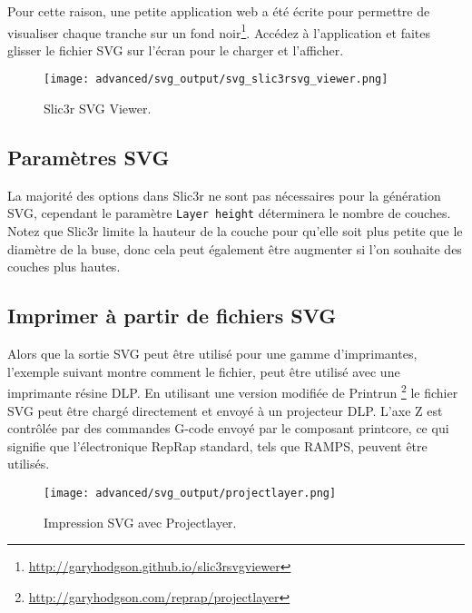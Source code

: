 Pour cette raison, une petite application web a \'et\'e \'ecrite pour permettre de visualiser chaque tranche sur un fond noir\footnote{\url{http://garyhodgson.github.io/slic3rsvgviewer}}.  Acc\'edez \`a l'application et faites glisser le fichier SVG sur l'\'ecran pour le charger et l'afficher.

\begin{figure}[H]
\centering
\texttt{[image: advanced/svg\_output/svg\_slic3rsvg\_viewer.png]}
\caption{Slic3r SVG Viewer.}
\label{fig:svg_slic3rsvg_viewer}
\end{figure}

\subsection{Param\`etres SVG} %
\label{sub:svg_settings}

La majorit\'e des options dans Slic3r ne sont pas n\'ecessaires pour la g\'en\'eration SVG, cependant le param\`etre \texttt{Layer height} d\'eterminera le nombre de couches. Notez que Slic3r limite la hauteur de la couche pour qu'elle soit plus petite que le diam\`etre de la buse, donc cela peut \'egalement \^etre augmenter si l'on souhaite des couches plus hautes.


\subsection{Imprimer \`a partir de fichiers SVG} %
\label{sub:printing_with_svg}

Alors que la sortie SVG peut \^etre utilis\'e pour une gamme d'imprimantes, l'exemple suivant montre comment le fichier, peut \^etre utilis\'e avec une imprimante r\'esine DLP. En utilisant une version modifi\'ee de Printrun \footnote{\url{http://garyhodgson.com/reprap/projectlayer}} le fichier SVG peut \^etre charg\'e directement et envoy\'e \`a un projecteur DLP. L'axe Z est contr\^ol\'ee par des commandes G-code envoy\'e par le composant printcore, ce qui signifie que l'\'electronique RepRap standard, tels que RAMPS, peuvent \^etre utilis\'es.


\begin{figure}[H]
\centering
\texttt{[image: advanced/svg\_output/projectlayer.png]}
\caption{Impression SVG avec Projectlayer.}
\label{fig:projectlayer}
\end{figure}



